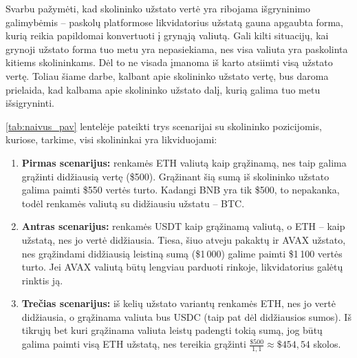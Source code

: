 \documentclass[]{VUMIFTemplateClass}
\begin{document}
Svarbu pažymėti, kad skolininko užstato vertė yra ribojama išgryninimo galimybėmis – paskolų platformose likvidatorius užstatą gauna apgaubta forma, kurią reikia papildomai konvertuoti į grynąją valiutą. Gali kilti situacijų, kai grynoji užstato forma tuo metu yra nepasiekiama, nes visa valiuta yra paskolinta kitiems skolininkams. Dėl to ne visada įmanoma iš karto atsiimti visą užstato vertę. Toliau šiame darbe, kalbant apie skolininko užstato vertę, bus daroma prielaida, kad kalbama apie skolininko užstato dalį, kurią galima tuo metu išsigryninti.

\ref{tab:naivus_pav} lentelėje pateikti trys scenarijai su skolininko pozicijomis, kuriose, tarkime, visi skolininkai yra likviduojami:
\begin{enumerate}
    \item \textbf{Pirmas scenarijus:} renkamės ETH valiutą kaip grąžinamą, nes taip galima grąžinti didžiausią vertę (\$500). Grąžinant šią sumą iš skolininko užstato galima paimti \$550 vertės turto. Kadangi BNB yra tik \$500, to nepakanka, todėl renkamės valiutą su didžiausiu užstatu – BTC.
    
    \item \textbf{Antras scenarijus:} renkamės USDT kaip grąžinamą valiutą, o ETH – kaip užstatą, nes jo vertė didžiausia. Tiesa, šiuo atveju pakaktų ir AVAX užstato, nes grąžindami didžiausią leistiną sumą (\$1\,000) galime paimti \$1\,100 vertės turto. Jei AVAX valiutą būtų lengviau parduoti rinkoje, likvidatorius galėtų rinktis ją.

    \item \textbf{Trečias scenarijus:} iš kelių užstato variantų renkamės ETH, nes jo vertė didžiausia, o grąžinama valiuta bus USDC (taip pat dėl didžiausios sumos). Iš tikrųjų bet kuri grąžinama valiuta leistų padengti tokią sumą, jog būtų galima paimti visą ETH užstatą, nes tereikia grąžinti $\frac{\$500}{1,1} \approx \$454,54$ skolos.
\end{enumerate}
\end{document}
